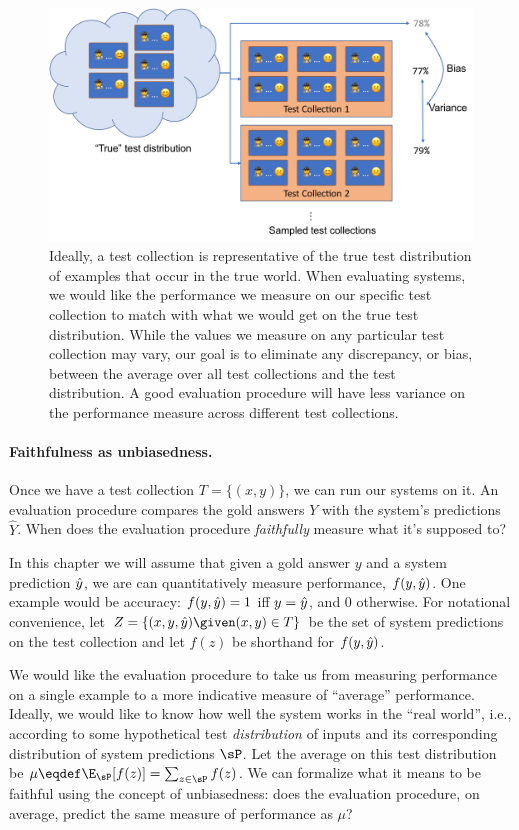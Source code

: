 \begin{figure}
  \centering
  \includegraphics[width=\textwidth]{figures/bias}
  \caption[Bias and variance when evaluating with test collections]{\label{setup:bias} Ideally, a test collection is representative of the true test distribution of examples that occur in the true world.
  When evaluating systems, we would like the performance we measure on our specific test collection to match with what we would get on the true test distribution.
  While the values we measure on any particular test collection may vary, our goal is to eliminate any discrepancy, or bias, between the average over all test collections and the test distribution.
  A good evaluation procedure will have less variance on the performance measure across different test collections.
  }
\end{figure}

\paragraph{Faithfulness as unbiasedness.}
Once we have a test collection $T = \{(x, y)\}$, we can run our systems on it.
An evaluation procedure compares the gold answers $Y$ with the system's predictions $\hat{Y}$.
When does the evaluation procedure \textit{faithfully} measure what it's supposed to?

In this chapter we will assume that given a gold answer $y$ and a system prediction $\hat{y}$, we are can quantitatively measure performance, $f(y, \hat{y})$.
One example would be accuracy: $f(y, \hat{y}) = 1$ iff $y = \hat{y}$, and $0$ otherwise.
For notational convenience, let $Z = \{(x, y, \yh) \given (x, y) \in T\}$ be the set of system predictions on the test collection and let $f(z)$ be shorthand for $f(y, \hat{y})$.

We would like the evaluation procedure to take us from measuring performance on a single example to a more indicative measure of ``average'' performance.
Ideally, we would like to know how well the system works in the ``real world'', i.e., according to some hypothetical test \textit{distribution} of inputs and its corresponding distribution of system predictions $\sP$.
Let the average on this test distribution be $\mu \eqdef \E_{\sP}[f(z)] = \sum_{z \in \sP} f(z)$.
We can formalize what it means to be faithful using the concept of unbiasedness: does the evaluation procedure, on average, predict the same measure of performance as $\mu$?

